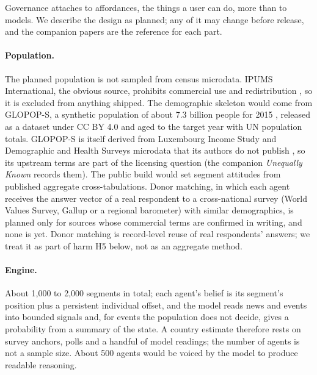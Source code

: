 \documentclass[11pt]{article}
\begin{document}
Governance attaches to affordances, the things a user can do, more than to models. We describe the design as planned; any of it may change before release, and the companion papers are the reference for each part.

\paragraph{Population.} The planned population is not sampled from census microdata. IPUMS International, the obvious source, prohibits commercial use and redistribution \citep{ipums_intl_terms}, so it is excluded from anything shipped. The demographic skeleton would come from GLOPOP-S, a synthetic population of about 7.3 billion people for 2015 \citep{ton2024glopop}, released as a dataset under CC BY 4.0 \citep{glopopdataverse} and aged to the target year with UN population totals. GLOPOP-S is itself derived from Luxembourg Income Study and Demographic and Health Surveys microdata that its authors do not publish \citep{glopopgithub}, so its upstream terms are part of the licensing question (the companion \emph{Unequally Known} records them). The public build would set segment attitudes from published aggregate cross-tabulations. Donor matching, in which each agent receives the answer vector of a real respondent to a cross-national survey (World Values Survey, Gallup or a regional barometer) with similar demographics, is planned only for sources whose commercial terms are confirmed in writing, and none is yet. Donor matching is record-level reuse of real respondents' answers; we treat it as part of harm H5 below, not as an aggregate method.

\paragraph{Engine.} About 1,000 to 2,000 segments in total; each agent's belief is its segment's position plus a persistent individual offset, and the model reads news and events into bounded signals and, for events the population does not decide, gives a probability from a summary of the state. A country estimate therefore rests on survey anchors, polls and a handful of model readings; the number of agents is not a sample size. About 500 agents would be voiced by the model to produce readable reasoning.
\end{document}
